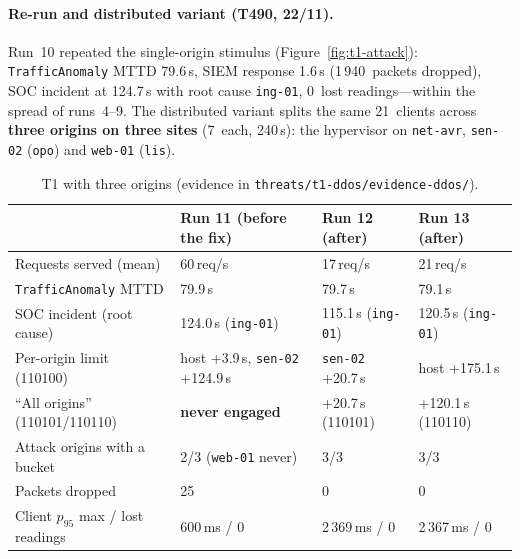 \documentclass[11pt,a4paper]{article}
\begin{document}
\paragraph{Re-run and distributed variant (T490, 22/11).}
Run~10 repeated the single-origin stimulus (Figure~\ref{fig:t1-attack}): \texttt{TrafficAnomaly}
MTTD 79.6\,s, SIEM response 1.6\,s (1\,940~packets dropped), SOC incident at 124.7\,s with
root cause \texttt{ing-01}, 0~lost readings---within the spread of runs~4--9. The distributed variant splits the same
21~clients across \textbf{three origins on three sites} (7~each, 240\,s): the hypervisor on
\texttt{net-avr}, \texttt{sen-02} (\texttt{opo}) and \texttt{web-01} (\texttt{lis}).

\begin{table}[H]
  \centering
  \caption{T1 with three origins (evidence in \texttt{threats/t1-ddos/evidence-ddos/}).}
  \label{tab:t1-ddos}
  \small
  \begin{tabular}{@{}p{3.6cm}p{3.4cm}p{3cm}p{3cm}@{}}
    \toprule
    & \textbf{Run 11} (before the fix) & \textbf{Run 12} (after) & \textbf{Run 13} (after) \\
    \midrule
    Requests served (mean) & 60\,req/s & 17\,req/s & 21\,req/s \\
    \texttt{TrafficAnomaly} MTTD & 79.9\,s & 79.7\,s & 79.1\,s \\
    SOC incident (root cause) & 124.0\,s (\texttt{ing-01}) & 115.1\,s (\texttt{ing-01}) & 120.5\,s (\texttt{ing-01}) \\
    Per-origin limit (110100) & host +3.9\,s, \texttt{sen-02} +124.9\,s & \texttt{sen-02} +20.7\,s & host +175.1\,s \\
    ``All origins'' (110101/110110) & \textbf{never engaged} & +20.7\,s (110101) & +120.1\,s (110110) \\
    Attack origins with a bucket & 2/3 (\texttt{web-01} never) & 3/3 & 3/3 \\
    Packets dropped & 25 & 0 & 0 \\
    Client $p_{95}$ max / lost readings & 600\,ms / 0 & 2\,369\,ms / 0 & 2\,367\,ms / 0 \\
    \bottomrule
  \end{tabular}
\end{table}
\end{document}
